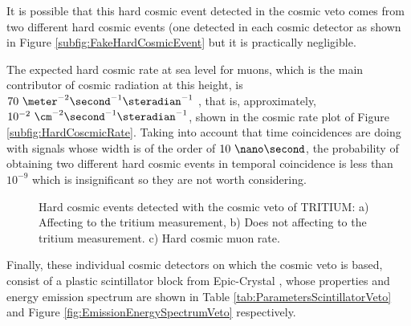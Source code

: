 It is possible that this hard cosmic event detected in the cosmic veto comes from two different hard cosmic events (one detected in each cosmic detector as shown in Figure \ref{subfig:FakeHardCosmicEvent} but it is practically negligible.

The expected hard cosmic rate at sea level for muons, which is the main contributor of cosmic radiation at this height, is $70~\meter^{-2}\second^{-1}\steradian^{-1}$ \cite{PDG, HardCosmicMuonRate}, that is, approximately, $10^{-2}~\cm^{-2}\second^{-1}\steradian^{-1}$, shown in the cosmic rate plot of Figure \ref{subfig:HardCoscmicRate}. Taking into account that time coincidences are doing with signals whose width is of the order of $10~\nano\second$, the probability of obtaining two different hard cosmic events in temporal coincidence is less than $10^{-9}$ which is insignificant so they are not worth considering.

\begin{figure}[h]
 \centering
 \caption{Hard cosmic events detected with the cosmic veto of TRITIUM: a) Affecting to the tritium measurement, b) Does not affecting to the tritium measurement. c) Hard cosmic muon rate. }
 \label{fig:HardCosmicEventsSimulation}
\end{figure}

Finally, these individual cosmic detectors on which the cosmic veto is based, consist of a plastic scintillator block from Epic-Crystal \cite{ScintillatorVeto}, whose properties and energy emission spectrum are shown in Table \ref{tab:ParametersScintillatorVeto} and Figure \ref{fig:EmissionEnergySpectrumVeto} respectively.

